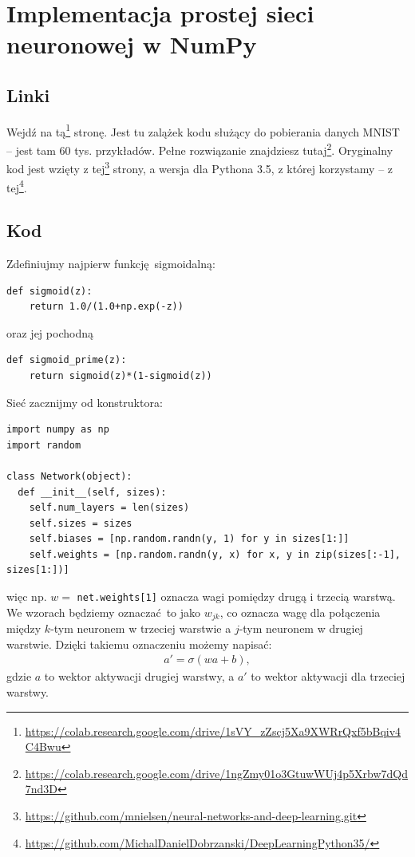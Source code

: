 \documentclass[10pt, oneside]{article}
\theoremstyle{remark}
\begin{document}
\section{Implementacja prostej sieci neuronowej w NumPy}
\subsection{Linki}
Wejdź na tą\footnote{\url{https://colab.research.google.com/drive/1sVY_zZscj5Xa9XWRrQxf5bBqiv4C4Bwu}} stronę. 
Jest tu zalążek kodu służący do pobierania danych MNIST -- jest tam 60 tys. przykładów.
Pełne rozwiązanie znajdziesz tutaj\footnote{\url{https://colab.research.google.com/drive/1ngZmy01o3GtuwWUj4p5Xrbw7dQd7nd3D}}.
Oryginalny kod jest wzięty z tej\footnote{\url{https://github.com/mnielsen/neural-networks-and-deep-learning.git}} strony, a wersja dla Pythona 3.5, z której korzystamy -- z tej\footnote{\url{https://github.com/MichalDanielDobrzanski/DeepLearningPython35/}}.

\subsection{Kod}
Zdefiniujmy najpierw funkcję sigmoidalną:
\begin{verbatim}
def sigmoid(z):
    return 1.0/(1.0+np.exp(-z))
\end{verbatim}
oraz jej pochodną
\begin{verbatim}
def sigmoid_prime(z):
    return sigmoid(z)*(1-sigmoid(z))
\end{verbatim}
Sieć zacznijmy od konstruktora:
\begin{verbatim}
import numpy as np
import random

class Network(object):
  def __init__(self, sizes):
    self.num_layers = len(sizes)
    self.sizes = sizes
    self.biases = [np.random.randn(y, 1) for y in sizes[1:]]
    self.weights = [np.random.randn(y, x) for x, y in zip(sizes[:-1], sizes[1:])]
\end{verbatim}
więc np. $w=$ \texttt{net.weights[1]} oznacza wagi pomiędzy drugą i trzecią warstwą.
We wzorach będziemy oznaczać to jako $w_{jk}$, co oznacza wagę dla połączenia między $k$-tym neuronem w trzeciej warstwie a $j$-tym neuronem w drugiej warstwie.
Dzięki takiemu oznaczeniu możemy napisać:
\begin{eqnarray} 
  a' = \sigma(w a + b),
\end{eqnarray}
gdzie $a$ to wektor aktywacji drugiej warstwy, a $a'$ to wektor aktywacji dla trzeciej warstwy.
\end{document}
